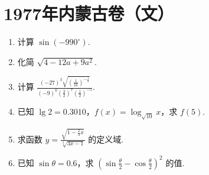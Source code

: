 \chapter{1977年内蒙古卷（文）}

\begin{problem}
\begin{enumerate}
\item 计算 \(\sin\left(-990^\circ\right)\).
\item 化简 \(\sqrt{4-12a+9a^2}\).
\item 计算 \(\frac{(-27)^3\sqrt{\left(\frac{1}{16}\right)^{-\frac{1}{2}}}}{(-9)^0\left(\frac{3}{2}\right)^7\left(\frac{1}{2}\right)^{-5}}\).
\item 已知 \(\lg2=0.3010\)，\(f\left(x\right)=\log_{\sqrt{10}}x\)，求 \(f\left(5\right)\).
\item 求函数 \(y=\frac{\sqrt{1-\frac{2}{3}x}}{\sqrt[3]{3x-1}}\) 的定义域.
\item 已知 \(\sin\theta=0.6\)，求 \(\left(\sin\frac{\theta}{2}-\cos\frac{\theta}{2}\right)^2\) 的值.
\end{enumerate}
\end{problem}


